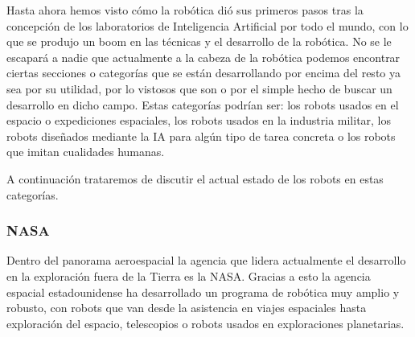 Hasta ahora hemos visto cómo la robótica dió sus primeros pasos tras la concepción de los laboratorios de Inteligencia Artificial por todo el mundo, con lo que se produjo un boom en las técnicas y el desarrollo de la robótica. No se le escapará a nadie que actualmente a la cabeza de la robótica podemos encontrar ciertas secciones o categorías que se están desarrollando por encima del resto ya sea por su utilidad, por lo vistosos que son o por el simple hecho de buscar un desarrollo en dicho campo. Estas categorías podrían ser: los robots usados en el espacio o expediciones espaciales, los robots usados en la industria militar, los robots diseñados mediante la IA para algún tipo de tarea concreta o los robots que imitan cualidades humanas.

A continuación trataremos de discutir el actual estado de los robots en estas categorías.

\subsubsection{NASA}
Dentro del panorama aeroespacial la agencia que lidera actualmente el desarrollo en la exploración fuera de la Tierra es la NASA. Gracias a esto la agencia espacial estadounidense ha desarrollado un programa de robótica muy amplio y robusto, con robots que van desde la asistencia en viajes espaciales hasta exploración del espacio, telescopios o robots usados en exploraciones planetarias.

